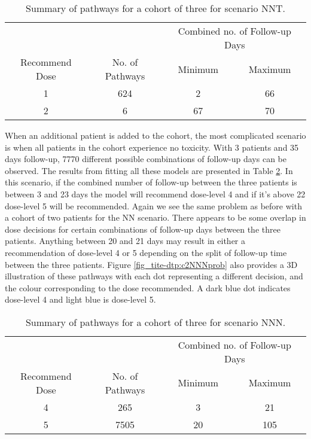 \begin{table}[H]
	\centering
	\caption{Summary of pathways for a cohort of three for scenario NNT. }
	\label{tab_tite-dtp:TITEDTP_c3NNT}
	\begin{tabular}{cccc}
		\hline
		\multicolumn{1}{l}{} & \multicolumn{1}{l}{} & \multicolumn{2}{c}{Combined no. of Follow-up Days} \\ \cline{3-4} 
		Recommend Dose & No. of Pathways & Minimum & Maximum \\ \hline
		1              & 624             & 2       & 66      \\
		2              & 6               & 67      & 70      \\ \hline
	\end{tabular}
\end{table}

When an additional patient is added to the cohort, the most complicated scenario is when all patients in the cohort experience no toxicity. With 3 patients and 35 days follow-up, 7770 different possible combinations of follow-up days can be observed. The results from fitting all these models are presented in Table \ref{tab_tite-dtp:TITEDTP_c3NNN}. In this scenario, if the combined number of follow-up between the three patients is between 3 and 23 days the model will recommend dose-level 4 and if it's above 22 dose-level 5 will be recommended. Again we see the same problem as before with a cohort of two patients for the NN scenario. There appears to be some overlap in dose decisions for certain combinations of follow-up days between the three patients. Anything between 20 and 21 days may result in either a recommendation of dose-level 4 or 5 depending on the split of follow-up time between the three patients. Figure \ref{fig_tite-dtp:c2NNNprob} also provides a 3D illustration of these pathways with each dot representing a different decision, and the colour corresponding to the dose recommended. A dark blue dot indicates dose-level 4 and light blue is dose-level 5.  

\begin{table}[H]
	\centering
	\caption{Summary of pathways for a cohort of three for scenario NNN. }
	\label{tab_tite-dtp:TITEDTP_c3NNN}
	\begin{tabular}{cccc}
		\hline
		\multicolumn{1}{l}{} & \multicolumn{1}{l}{} & \multicolumn{2}{c}{Combined no. of Follow-up Days} \\ \cline{3-4} 
		Recommend Dose & No. of Pathways & Minimum & Maximum \\ \hline
		4              & 265             & 3       & 21      \\
		5              & 7505            & 20      & 105      \\ \hline
	\end{tabular}
\end{table}

